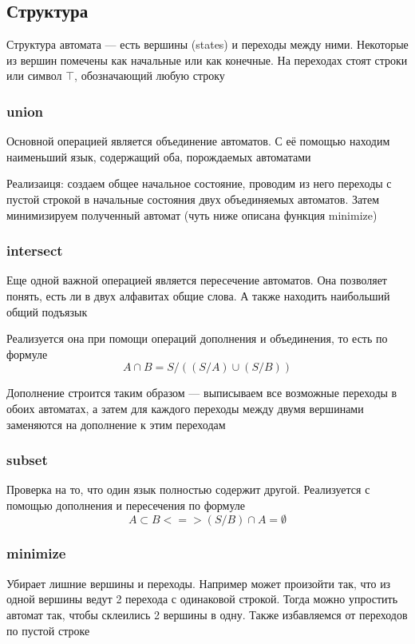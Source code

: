 \newpage
\subsection{Структура}
Структура автомата --- есть вершины (states) и переходы между ними. Некоторые из вершин помечены как начальные или как конечные. На переходах стоят строки или символ $\top$, обозначающий любую строку

\subsubsection*{union}
Основной операцией является объединение автоматов. С её помощью находим наименьший язык, содержащий оба, порождаемых автоматами

Реализаиця: создаем общее начальное состояние, проводим из него переходы с пустой строкой в начальные состояния двух объединяемых автоматов. Затем минимизируем полученный автомат (чуть ниже описана функция minimize)

\subsubsection*{intersect}
Еще одной важной операцией является пересечение автоматов. Она позволяет понять, есть ли в двух алфавитах общие слова. А также находить наибольший общий подъязык

Реализуется она при помощи операций дополнения и объединения, то есть по формуле \[A \cap B = S / ((S / A) \cup (S / B))\]

Дополнение строится таким образом --- выписываем все возможные переходы в обоих автоматах, а затем для каждого переходы между двумя вершинами заменяются на дополнение к этим переходам

\subsubsection*{subset}
Проверка на то, что один язык полностью содержит другой. Реализуется с помощью дополнения и пересечения по формуле
\[A \subset B <=> (S / B) \cap A = \emptyset\]

\subsubsection*{minimize}
Убирает лишние вершины и переходы. Например может произойти так, что из одной вершины ведут 2 перехода с одинаковой строкой. Тогда можно упростить автомат так, чтобы склеились 2 вершины в одну. Также избавляемся от переходов по пустой строке

